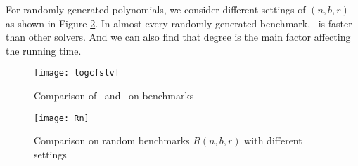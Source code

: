 %
%
%
%
%
%
%
%
%
%
%



For randomly generated polynomials, we consider different settings of
$(n,b,r)$ as shown in Figure \ref{fig:2}.  In almost every randomly generated benchmark, \froot\  is  faster than other  solvers. And we can also  find that
degree is the main factor affecting the  running time.

\begin{figure}
	\begin{centering}
		\texttt{[image: logcfslv]}
		\caption{ Comparison of \froot\ and \SLV\ on benchmarks\label{fig:3}}
	\end{centering}
\end{figure}

\begin{figure}
	\begin{centering}
		\texttt{[image: Rn]}
		\caption{ Comparison on random benchmarks $R(n,b,r)$ with different settings\label{fig:2}}
	\end{centering}
\end{figure}

